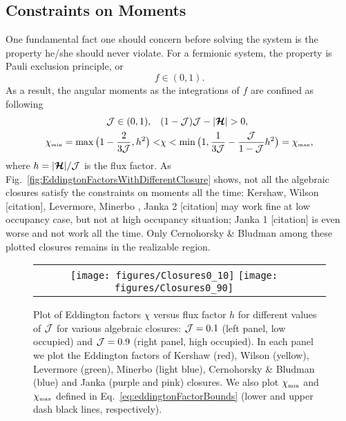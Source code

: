 \subsection{Constraints on Moments}
One fundamental fact one should concern before solving the system is the property he/she should never violate.
For a fermionic system, the property is Pauli exclusion principle, or 
\begin{equation}
f \in (0,1).
\end{equation}
As a result, the angular moments as the integrations of $f$ are confined as following
\begin{align}
\mathcal{J} \in(0,1), \quad &(1-\mathcal{J})\mathcal{J}-|\boldsymbol{\mathcal{H}}|  > 0, \\
  \chi_{\mbox{\tiny min}}
  =\max\big(1-\frac{2}{3\mathcal{J}},h^{2}\big)
  < & \chi<\min\big(1,\frac{1}{3\mathcal{J}}-\frac{\mathcal{J}}{1-\mathcal{J}}h^{2}\big)=\chi_{\mbox{\tiny max}},
  \label{eq:eddingtonFactorBounds}
\end{align}
where $h = |\boldsymbol{\mathcal{H}}|/\mathcal{J}$ is the flux factor.
As Fig.~\eqref{fig:EddingtonFactorsWithDifferentClosure} shows, not all the algebraic closures satisfy the constraints on moments all the time: Kershaw\cite{kershaw_1976}, Wilson [citation], Levermore\cite{levermore_1984}, Minerbo \cite{minerbo_1978}, Janka 2 [citation] may work fine at low occupancy case, but not at high occupancy situation; Janka 1 [citation] is even worse and not work all the time. Only Cernohorsky \& Bludman\cite{cernohorskyBludman_1994} among these plotted closures remains in the realizable region.
\begin{figure}[h]
  \centering
  \begin{tabular}{cc}
    \texttt{[image: figures/Closures0\_10]}
    \texttt{[image: figures/Closures0\_90]}
  \end{tabular}
   \caption{Plot of Eddington factors $\chi$ versus flux factor $h$ for different values of $\mathcal{J}$ for various algebraic closures: $\mathcal{J}=0.1$ (left panel, low occupied) and $\mathcal{J}=0.9$ (right panel, high occupied).  In each panel we plot the Eddington factors of Kershaw (red), Wilson (yellow), Levermore (green), Minerbo (light blue), Cernohorsky \& Bludman (blue) and Janka (purple and pink) closures.  We also plot $\chi_{\mbox{\tiny min}}$ and $\chi_{\mbox{\tiny max}}$ defined in Eq.~\eqref{eq:eddingtonFactorBounds} (lower and upper dash black lines, respectively).}
  \label{fig:EddingtonFactorsWithDifferentClosure}
\end{figure}

